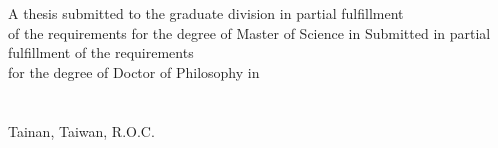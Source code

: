 \begin{minipage}[c][5cm][t]{\textwidth}
  \begin{center}\Large %
  {%
    A thesis submitted to the graduate division in partial fulfillment\\
    of the requirements for the degree of Master of Science in%
  } %
  {%
    Submitted in partial fulfillment of the requirements\\%
    for the degree of Doctor of Philosophy in%
  } %
  \GetDeptEngName\\%
  \GetCollEngName\\%
  \GetUniversityEngName\\%
  Tainan, Taiwan, R.O.C.\\%
  \vspace{0.1cm}
  \GetOralEngDay \thinspace \thinspace \GetThesisMonthInEng \thinspace \thinspace \GetThesisYear%
  \end{center}
\end{minipage}


\vspace{0.8cm}

\begin{minipage}[c][9.0cm][t]{\textwidth}
   \\

  \vspace{0.48cm}

  \DisplayCommitteeSignatureArea
\end{minipage}


\vspace{1.5cm}


\begin{minipage}[c][2.0cm][t]{\textwidth}
  \begin{center}
    \makebox[1em][c]{\Large:}
    \makebox[7.2em][l]{\namesigdate}\\

    \vspace{1.0cm}

    \makebox[1em][c]{\Large:}
    \makebox[7.2em][l]{\namesigdate}\\
  \end{center}
\end{minipage}

\EndOralTemplateDoc

